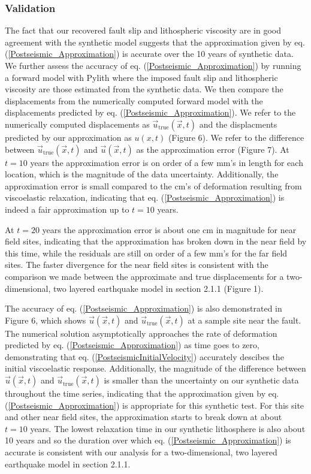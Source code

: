 \documentclass[extra]{gji}
\begin{document}
\subsubsection{Validation}
The fact that our recovered fault slip and lithospheric viscosity are
in good agreement with the synthetic model suggests that the
approximation given by eq. (\ref{Postseismic_Approximation}) is
accurate over the 10 years of synthetic data.  We further assess the accuracy
of eq. (\ref{Postseismic_Approximation}) by running a forward model
with Pylith where the imposed fault slip and lithospheric viscosity
are those estimated from the synthetic data.  We then compare the
displacements from the numerically computed forward model with the
displacements predicted by eq. (\ref{Postseismic_Approximation}).  We
refer to the numerically computed displacements as
$\vec{u}_{\mathrm{true}}(\vec{x},t)$ and the displacments predicted by our
approximation as $u(x,t)$ (Figure 6).  We refer to the
difference between $\vec{u}_{\mathrm{true}}(\vec{x},t)$ and $\vec{u}(\vec{x},t)$
as the approximation error (Figure 7). At $t=10$ years the
approximation error is on order of a few mm's in length for each
location, which is the magnitude of the data uncertainty.
Additionally, the approximation error is small compared to the
cm's of deformation resulting from viscoelastic relaxation, indicating
that eq. (\ref{Postseismic_Approximation}) is indeed a fair
approximation up to $t=10$ years.  

At $t=20$ years the approximation error is about
one cm in magnitude for near field sites, indicating that the
approximation has broken down in the near field by this time, while
the residuals are still on order of a few mm's for the far field
sites.  The faster divergence for the near field sites is consistent
with the comparison we made between the approximate and true
displacements for a two-dimensional, two layered earthquake model in
section 2.1.1 (Figure 1).

The accuracy of eq. (\ref{Postseismic_Approximation}) is also
demonstrated in Figure 6, which shows $\vec{u}(\vec{x},t)$ and
$\vec{u}_{\mathrm{true}}(\vec{x},t)$ at a sample site near the fault.  The
numerical solution asymptotically approaches the rate of deformation
predicted by eq. (\ref{Postseismic_Approximation}) as time goes to
zero, demonstrating that eq. (\ref{PostseismicInitialVelocity})
accurately descibes the initial viscoelastic response.  Additionally,
the magnitude of the difference between $\vec{u}(\vec{x},t)$ and
$\vec{u}_{\mathrm{true}}(\vec{x},t)$ is smaller than the uncertainty on our
synthetic data throughout the time series, indicating that the
approximation given by eq. (\ref{Postseismic_Approximation}) is
appropriate for this synthetic test.  For this site and other near
field sites, the approximation starts to break down at about $t=10$
years. The lowest relaxation time in our synthetic lithosphere is also
about 10 years and so the duration over which
eq. (\ref{Postseismic_Approximation}) is accurate is consistent with
our analysis for a two-dimensional, two layered earthquake model in
section 2.1.1.
\end{document}
